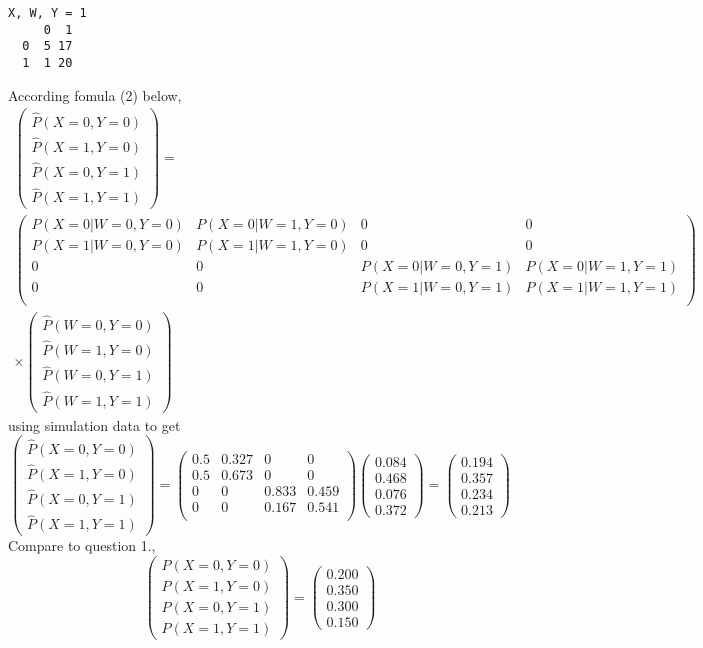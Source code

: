 \begin{enumerate}
\begin{lstlisting}
X, W, Y = 1  
     0  1
  0  5 17
  1  1 20
\end{lstlisting}
According fomula (2) below,
\begin{multline}
\begin{pmatrix}\hat P(X=0, Y=0)\\\hat P(X=1, Y=0)\\\hat P(X=0, Y=1)\\\hat P(X=1, Y=1)\end{pmatrix}=\\
\begin{pmatrix}
P(X=0|W=0, Y=0) & P(X=0|W=1, Y=0) & 0 & 0\\
P(X=1|W=0, Y=0) & P(X=1|W=1, Y=0) & 0 & 0\\
0 & 0 & P(X=0|W=0, Y=1) & P(X=0|W=1, Y=1)\\
0 & 0 & P(X=1|W=0, Y=1) & P(X=1|W=1, Y=1)\\
\end{pmatrix}\\
\times\begin{pmatrix}\hat P(W=0, Y=0)\\\hat P(W=1, Y=0)\\\hat P(W=0, Y=1)\\\hat P(W=1, Y=1)\end{pmatrix}
\end{multline}
using simulation data to get
\[\begin{pmatrix}\hat P(X=0, Y=0)\\\hat P(X=1, Y=0)\\\hat P(X=0, Y=1)\\\hat P(X=1, Y=1)\end{pmatrix}=
\begin{pmatrix}
0.5 & 0.327 & 0 & 0\\
0.5 & 0.673 & 0 & 0\\
0 & 0 & 0.833 & 0.459\\
0 & 0 & 0.167 & 0.541\\
\end{pmatrix}
\begin{pmatrix}0.084\\0.468\\0.076\\0.372\end{pmatrix}=
\begin{pmatrix}0.194\\0.357\\0.234\\0.213\end{pmatrix}\]
Compare to question 1., \[\begin{pmatrix} P(X=0, Y=0)\\ P(X=1, Y=0)\\ P(X=0, Y=1)\\ P(X=1, Y=1)\end{pmatrix}=\begin{pmatrix} 0.200\\0.350\\0.300\\0.150\end{pmatrix}\]


\end{enumerate}


